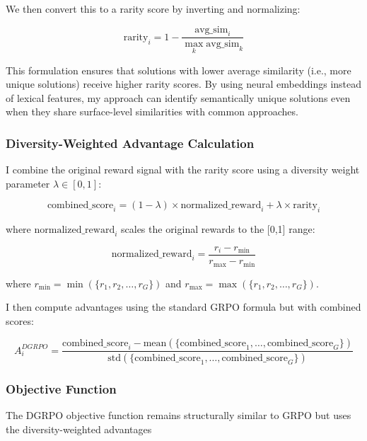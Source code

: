 \documentclass[10pt,twocolumn,letterpaper]{article}
\begin{document}
We then convert this to a rarity score by inverting and normalizing:

\begin{equation}
\text{rarity}_i = 1 - \frac{\text{avg\_sim}_i}{\max_{k} \text{avg\_sim}_k}
\end{equation}

This formulation ensures that solutions with lower average similarity (i.e., more unique solutions) receive higher rarity scores. By using neural embeddings instead of lexical features, my approach can identify semantically unique solutions even when they share surface-level similarities with common approaches.

\subsubsection{Diversity-Weighted Advantage Calculation}
I combine the original reward signal with the rarity score using a diversity weight parameter $\lambda \in [0,1]$:

\begin{equation}
\text{combined\_score}_i = (1 - \lambda) \times \text{normalized\_reward}_i + \lambda \times \text{rarity}_i
\end{equation}

where $\text{normalized\_reward}_i$ scales the original rewards to the [0,1] range:

\begin{equation}
\text{normalized\_reward}_i = \frac{r_i - r_{\min}}{r_{\max} - r_{\min}}
\end{equation}

where $r_{\min} = \min(\{r_1, r_2, \ldots, r_G\})$ and $r_{\max} = \max(\{r_1, r_2, \ldots, r_G\})$.

I then compute advantages using the standard GRPO formula but with combined scores:

\begin{equation}
A_i^{DGRPO} = \frac{\text{combined\_score}_i - \text{mean}(\{\text{combined\_score}_1, \ldots, \text{combined\_score}_G\})}{\text{std}(\{\text{combined\_score}_1, \ldots, \text{combined\_score}_G\})}
\end{equation}

\subsubsection{Objective Function}
The DGRPO objective function remains structurally similar to GRPO but uses the diversity-weighted advantages
\end{document}
